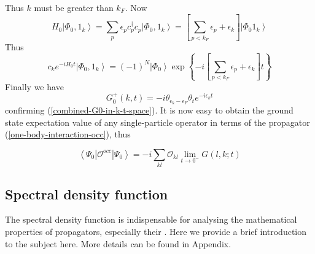 Thus $k$ must be greater than $k_F$. Now
\begin{equation}H_{0}\left|\Phi_{0}, 1_{k}\right\rangle=\sum_{p} \epsilon_{p} c_{p}^{\dagger} c_{p}\left|\Phi_{0}, 1_{k}\right\rangle=\left[\sum_{p<k_{F}} \epsilon_{p}+\epsilon_{k}\right]\left|\Phi_{0} 1_{k}\right\rangle\end{equation}
Thus
\begin{equation}c_{k} e^{-i H_{0} t}\left|\Phi_{0}, 1_{k}\right\rangle=(-1)^{N}\left|\Phi_{0}\right\rangle \exp \left\{-i\left[\sum_{p<k_{F}} \epsilon_{p}+\epsilon_{k}\right] t\right\}\end{equation}
Finally we have
\begin{equation}G_{0}^{+}(k, t)=-i \theta_{\epsilon_k-\epsilon_F} \theta_{t} e^{-i \epsilon_k t}\end{equation}
confirming (\ref{combined-G0-in-k-t-space}). It is now easy to obtain the ground state expectation value of any single-particle operator in terms of the propagator (\ref{one-body-interaction-occ}), thus
\begin{imp}
\begin{equation}\left\langle\Psi_{0}\left|\mathcal{O}^{o c c}\right| \Psi_{0}\right\rangle=-i \sum_{k l} \mathcal{O}_{k l} \lim _{t \rightarrow 0^{-}} G(l, k ; t)\end{equation}
\end{imp}
\subsection{Spectral density function}
The spectral density function is indispensable for analysing the mathematical properties of propagators, especially their . Here we provide a brief introduction to the subject here. More details can be found in Appendix.

